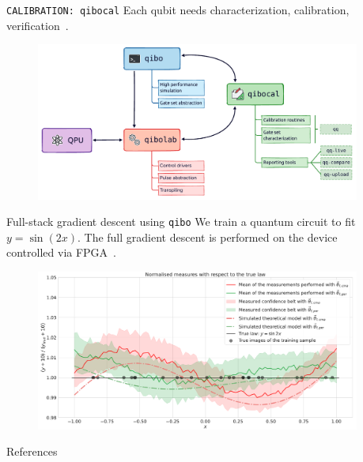 \documentclass[20pt, final]{beamer}
\newlength{\sepwidth}
\newlength{\colwidth}
\newcommand{\separatorcolumn}{\begin{column}{\sepwidth}\end{column}}
\begin{document}
\begin{frame}[t]
\begin{columns}[t]
\begin{column}{\colwidth}
  \begin{block}{\texttt{CALIBRATION: qibocal}}
  Each qubit needs characterization, calibration, verification~\cite{pasquale2023opensource}.
  \begin{figure}
    \includegraphics[width=1  \textwidth]{figures/qibocal.pdf}
  \end{figure}
  \end{block}

  \begin{block}{Full-stack gradient descent using \texttt{qibo}}
  We train a quantum circuit to fit $y=\sin (2x)$. The full gradient descent
  is performed on the device controlled via FPGA~\cite{robbiati2022quantum}.
  \begin{figure}
    \includegraphics[width=1  \textwidth]{figures/sgd.pdf}
  \end{figure}
  \end{block}

  \begin{block}{References}
  \nocite{*}
    \small  {}
  \end{block}

\end{column}

\separatorcolumn
\end{columns}
\end{frame}
\end{document}
